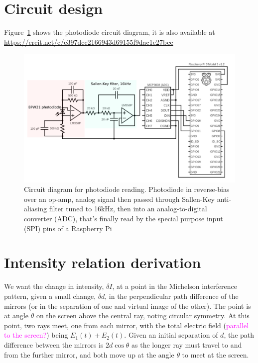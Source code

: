 \documentclass[prb,preprint]{revtex4-1}
\newcommand{\jam}{\textcolor{magenta}}
\begin{document}
\section{Circuit design}
\label{app:circuit_diagram}

Figure~\ref{fig:circuit_diagram} shows the photodiode circuit diagram, it is also available at \url{https://crcit.net/c/e397dcc2166943d69155f9dac1e27bce}

\begin{figure}%
	\includegraphics[width=\textwidth]{figures/circuit_diagram_2.pdf}
	\caption{Circuit diagram for photodiode reading. Photodiode in reverse-bias over an op-amp, analog signal then passed through Sallen-Key anti-aliasing filter tuned to 16kHz, then into an analog-to-digital converter (ADC), that’s finally read by the special purpose input (SPI) pins of a Raspberry Pi}
	\label{fig:circuit_diagram}
\end{figure}


\section{Intensity relation derivation}
\label{app:intensity_derivation}

We want the change in intensity, $\delta I$, at a point in the Michelson interference pattern, given a small change, $\delta d$, in the perpendicular path difference of the mirrors (or in the separation of one and virtual image of the other). The point is at angle $\theta$ on the screen above the central ray, noting circular symmetry. At this point, two rays meet, one from each mirror, with the total electric field (\jam{parallel to the screen?}) being $E_1(t) + E_2(t)$. Given an initial separation of $d$, the path difference between the mirrors is $2 d \cos{\theta}$ as the longer ray must travel to and from the further mirror, and both move up at the angle $\theta$ to meet at the screen.
\end{document}
